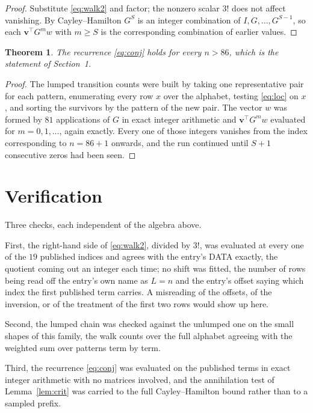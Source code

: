 \documentclass[11pt,a4paper]{article}
\theoremstyle{plain}
\newtheorem{theorem}{Theorem}
\theoremstyle{definition}
\begin{document}
\begin{proof}
Substitute \eqref{eq:walk2} and factor; the nonzero scalar $3!$ does not affect
vanishing. By Cayley--Hamilton $G^{S}$ is an integer combination of $I,G,\dots,G^{S-1}$,
so each $\mathbf{v}^{\!\top}G^{m}w$ with $m\ge S$ is the corresponding combination of
earlier values.
\end{proof}

\begin{theorem}
The recurrence \eqref{eq:conj} holds for every $n>86$, which is the statement of
Section~1.
\end{theorem}

\begin{proof}
The lumped transition counts were built by taking one representative pair for each pattern,
enumerating every row $x$ over the alphabet, testing \eqref{eq:loc} on $x$, and sorting
the survivors by the pattern of the new pair. The vector $w$ was formed by $81$
applications of $G$ in exact integer arithmetic and $\mathbf{v}^{\!\top}G^{m}w$
evaluated for $m=0,1,\dots$, again exactly. Every one of those integers vanishes from the
index corresponding to $n=86+1$ onwards, and the run continued until $S+1$ consecutive
zeros had been seen.
\end{proof}

\section{Verification}

Three checks, each independent of the algebra above.

First, the right-hand side of \eqref{eq:walk2}, divided by $3!$, was evaluated at every
one of the $19$ published indices and agrees with the entry's DATA exactly, the quotient
coming out an integer each time; no shift was fitted, the number of rows being read off the
entry's own name as $L=n$ and the entry's offset saying which index the first published
term carries. A misreading of the offsets, of the inversion, or of the treatment of the first
two rows would show up here.

Second, the lumped chain was checked against the unlumped one on the small shapes of this
family, the walk counts over the full alphabet agreeing with the weighted sum over patterns
term by term.

Third, the recurrence \eqref{eq:conj} was evaluated on the published terms in exact integer
arithmetic with no matrices involved, and the annihilation test of Lemma~\ref{lem:crit} was
carried to the full Cayley--Hamilton bound rather than to a sampled prefix.
\end{document}
